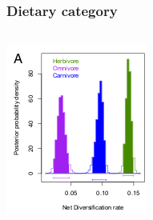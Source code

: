 \documentclass{beamer}
\begin{document}
\begin{frame}
  \frametitle{Dietary category}
  \begin{columns}
    \begin{column}{0.5\textwidth}
      \begin{center}
        \includegraphics[height=0.4\textheight, width=\textwidth, keepaspectratio=true]{figure/dietdiv}

        \tiny{}


\end{center}
\end{column}
\end{columns}
\end{frame}
\end{document}
